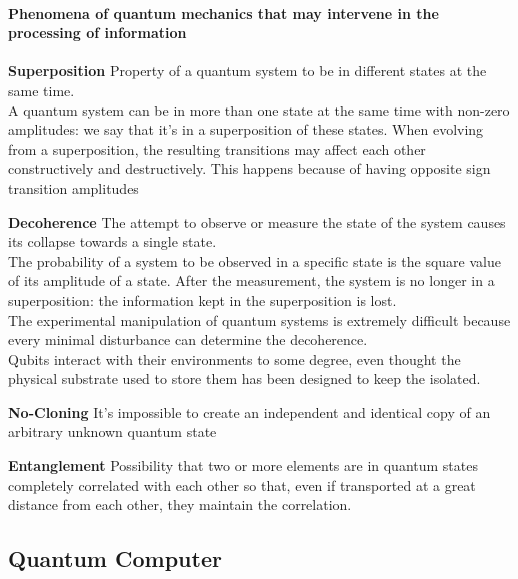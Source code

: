 \documentclass[10pt]{report}
\begin{document}
\paragraph{Phenomena of quantum mechanics that may intervene in the processing of information}
\begin{list}{}{}
	\item \textbf{Superposition} Property of a quantum system to be in different states at the same time.\\
	A quantum system can be in more than one state at the same time with non-zero amplitudes: we say that it's in a superposition of these states. When evolving from a superposition, the resulting transitions may affect each other constructively and destructively. This happens because of having opposite sign transition amplitudes
	\item \textbf{Decoherence} The attempt to observe or measure the state of the system causes its collapse towards a single state.\\
	The probability of a system to be observed in a specific state is the square value of its amplitude of a state. After the measurement, the system is no longer in a superposition: the information kept in the superposition is lost.\\
	The experimental manipulation of quantum systems is extremely difficult because every minimal disturbance can determine the decoherence.\\
	Qubits interact with their environments to some degree, even thought the physical substrate used to store them has been designed to keep the isolated.
	\item \textbf{No-Cloning} It's impossible to create an independent and identical copy of an arbitrary unknown quantum state
	\item \textbf{Entanglement} Possibility that two or more elements are in quantum states completely correlated with each other so that, even if transported at a great distance from each other, they maintain the correlation.
\end{list}
\subsection{Quantum Computer}
\end{document}
